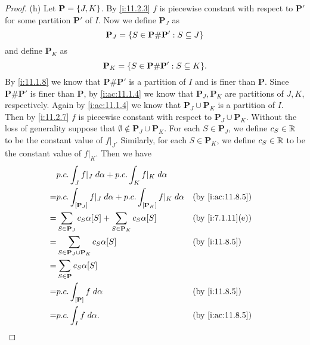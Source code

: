 \begin{proof}{(h)}
  Let \(\mathbf{P} = \left\lbrace J, K\right\rbrace\).
  By \cref{i:11.2.3} \(f\) is piecewise constant with respect to \(\mathbf{P}'\) for some partition \(\mathbf{P}'\) of \(I\).
  Now we define \(\mathbf{P}_J\) as
  \[
    \mathbf{P}_J = \left\lbrace S \in \mathbf{P} \# \mathbf{P}' : S \subseteq J\right\rbrace
  \]
  and define \(\mathbf{P}_K\) as
  \[
    \mathbf{P}_K = \set{S \in \mathbf{P} \# \mathbf{P}' : S \subseteq K}.
  \]
  By \cref{i:11.1.8} we know that \(\mathbf{P} \# \mathbf{P}'\) is a partition of \(I\) and is finer than \(\mathbf{P}\).
  Since \(\mathbf{P} \# \mathbf{P}'\) is finer than \(\mathbf{P}\), by \cref{i:ac:11.1.4} we know that \(\mathbf{P}_J, \mathbf{P}_K\) are partitions of \(J, K\), respectively.
  Again by \cref{i:ac:11.1.4} we know that \(\mathbf{P}_J \cup \mathbf{P}_K\) is a partition of \(I\).
  Then by \cref{i:11.2.7} \(f\) is piecewise constant with respect to \(\mathbf{P}_J \cup \mathbf{P}_K\).
  Without the loss of generality suppose that \(\emptyset \notin \mathbf{P}_J \cup \mathbf{P}_K\).
  For each \(S \in \mathbf{P}_J\), we define \(c_S \in \mathbb{R}\) to be the constant value of \(f|_J\).
  Similarly, for each \(S \in \mathbf{P}_K\), we define \(c_S \in \mathbb{R}\) to be the constant value of \(f|_K\).
  Then we have
  \begin{align*}
      & p.c. \int_J f|_J \; d \alpha + p.c. \int_K f|_K \; d \alpha                                                     \\
    = & p.c. \int_{[\mathbf{P}_J]} f|_J \; d \alpha + p.c. \int_{[\mathbf{P}_K]} f|_K \; d \alpha &  & \by{i:ac:11.8.5} \\
    = & \sum_{S \in \mathbf{P}_J} c_S \alpha[S] + \sum_{S \in \mathbf{P}_K} c_S \alpha[S]         &  & \by{i:7.1.11}[e] \\
    = & \sum_{S \in \mathbf{P}_J \cup \mathbf{P}_K} c_S \alpha[S]                                 &  & \by{i:11.8.5}    \\
    = & \sum_{S \in \mathbf{P}} c_S \alpha[S]                                                                           \\
    = & p.c. \int_{[\mathbf{P}]} f \; d \alpha                                                    &  & \by{i:11.8.5}    \\
    = & p.c. \int_I f \; d \alpha.                                                                &  & \by{i:ac:11.8.5}
  \end{align*}
\end{proof}

